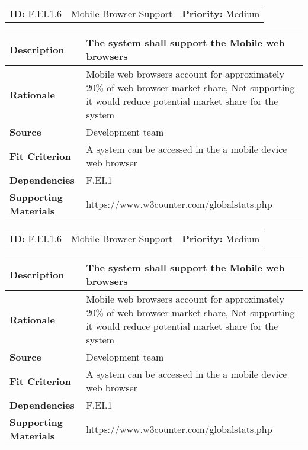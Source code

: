 \begin{table}[H]
    \begin{tabularx}{\textwidth}{| l | X | l |}
        \hline
        \textbf{ID:} F.EI.1.6 & Mobile Browser Support & \textbf{Priority:} Medium \\
    \end{tabularx}
    \begin{tabularx}{\textwidth}{| l | X |}
        \hline
        \textbf{Description} & The system shall support the Mobile web browsers \\ \hline
        \textbf{Rationale} & Mobile web browsers account for approximately 20\% of web browser market share, Not supporting it would reduce potential market share for the system\\ \hline
        \textbf{Source} &  Development team\\ \hline
        \textbf{Fit Criterion} & A system can be accessed in the a mobile device web browser   \\ \hline
        \textbf{Dependencies} & F.EI.1 \\ \hline
        \textbf{Supporting Materials} & https://www.w3counter.com/globalstats.php \\ \hline
    \end{tabularx}
\end{table}

\begin{table}[H]
    \begin{tabularx}{\textwidth}{| l | X | l |}
        \hline
        \textbf{ID:} F.EI.1.6 & Mobile Browser Support & \textbf{Priority:} Medium \\
    \end{tabularx}
    \begin{tabularx}{\textwidth}{| l | X |}
        \hline
        \textbf{Description} & The system shall support the Mobile web browsers \\ \hline
        \textbf{Rationale} & Mobile web browsers account for approximately 20\% of web browser market share, Not supporting it would reduce potential market share for the system\\ \hline
        \textbf{Source} &  Development team\\ \hline
        \textbf{Fit Criterion} & A system can be accessed in the a mobile device web browser   \\ \hline
        \textbf{Dependencies} & F.EI.1 \\ \hline
        \textbf{Supporting Materials} & https://www.w3counter.com/globalstats.php \\ \hline
    \end{tabularx}
\end{table}

